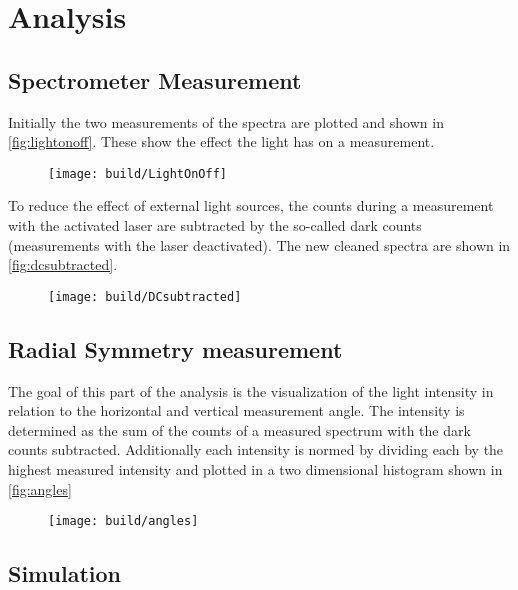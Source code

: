 \section{Analysis}
\label{sec:Analysis}

\subsection{Spectrometer Measurement}

Initially the two measurements of the spectra are plotted and shown in \autoref{fig:lightonoff}. 
These show the effect the light has on a measurement.

\begin{figure}[H]
	\centering
	\texttt{[image: build/LightOnOff]}
	\caption{}
	\label{fig:lightonoff}
\end{figure}

To reduce the effect of external light sources, the counts during a measurement with the activated laser are subtracted by the
so-called dark counts (measurements with the laser deactivated). The new cleaned spectra are shown in \autoref{fig:dcsubtracted}.

\begin{figure}[H]
	\centering
	\texttt{[image: build/DCsubtracted]}
	\caption{}
	\label{fig:dcsubtracted}
\end{figure}

\subsection{Radial Symmetry measurement}
The goal of this part of the analysis is the visualization of the light intensity in relation to the horizontal and vertical measurement angle.
The intensity is determined as the sum of the counts of a measured spectrum with the dark counts subtracted. 
Additionally each intensity is normed by dividing each by the highest measured intensity and plotted in a two dimensional histogram shown in \autoref{fig:angles}

\begin{figure}
	\centering
	\texttt{[image: build/angles]}
	\caption{}
	\label{fig:angles}
\end{figure}

\subsection{Simulation}

